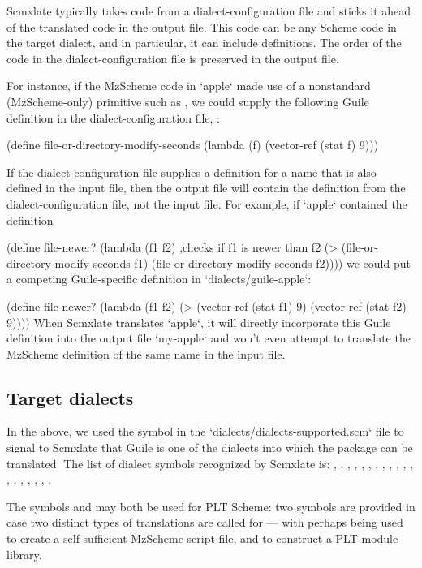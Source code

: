 Scmxlate typically takes code from a
dialect-configuration file and sticks it  ahead of the
translated code in the output file.  This code can be
any Scheme code in the target dialect, and in
particular, it can include definitions.  The order of
the code in the dialect-configuration file is preserved
in the output file.

For instance, if the MzScheme code in `apple` made
use of a nonstandard (MzScheme-only) primitive such as
, we could supply
the following Guile definition in the
dialect-configuration file,
:

\begintts
(define file-or-directory-modify-seconds
  (lambda (f) (vector-ref (stat f) 9)))
\endtt

If the dialect-configuration file supplies a definition for
a name that is also defined in the input file,
then the output file will contain the definition from
the dialect-configuration file, not the input file.
For example, if `apple` contained
the definition

\begintts
(define file-newer?
  (lambda (f1 f2)
    ;checks if f1 is newer than f2
    (> (file-or-directory-modify-seconds f1)
       (file-or-directory-modify-seconds f2))))
\endtt
we could put a competing Guile-specific definition
in `dialects/guile-apple`:

\begintts
(define file-newer?
  (lambda (f1 f2)
    (> (vector-ref (stat f1) 9)
       (vector-ref (stat f2) 9))))
\endtt
When Scmxlate translates `apple`, it will directly
incorporate this Guile definition into the output file
`my-apple` and won’t even attempt to translate
the MzScheme definition of the same name in the
input file.

\subsection{Target dialects}

In the above, we used the symbol  in the
`dialects/dialects-supported.scm` file to signal to
Scmxlate that Guile is one of the dialects into which
the package can be translated.  The list of dialect symbols
recognized by Scmxlate is: , ,
,
, , , , ,
, , , , ,
, , , , ,
.

The symbols  and 
may both be used for PLT Scheme: two symbols are
provided in case two distinct types of translations are
called for --- with  perhaps being used to create a
self-sufficient MzScheme script file, and  to construct a
PLT module library.

